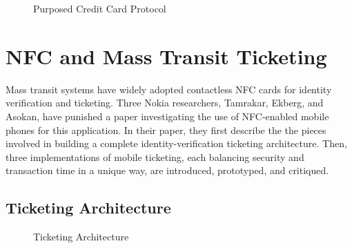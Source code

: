 \documentclass{sig-alternate}
\begin{document}

\begin{figure}
\centering
{}
\caption{Purposed Credit Card Protocol~\cite{CC2016}}
\label{fig:secureCC}
\end{figure}



\section{NFC and Mass Transit Ticketing}
\label{sec:mobile}

Mass transit systems have widely adopted contactless NFC cards for identity verification and ticketing. Three Nokia researchers, Tamrakar, Ekberg, and Asokan, have punished a paper investigating the use of NFC-enabled mobile phones for this application. In their paper, they first describe the the pieces involved in building a complete identity-verification ticketing architecture. Then, three implementations of mobile ticketing, each balancing security and transaction time in a unique way, are introduced, prototyped, and critiqued.\cite{Ticket2011}

\subsection{Ticketing Architecture}

\begin{figure}
\centering
{}
\caption{Ticketing Architecture~\cite{Ticket2011}}
\label{fig:secureCC}
\end{figure}


\end{document}
